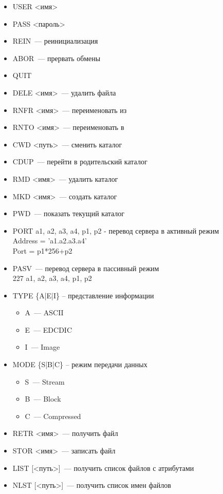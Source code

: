 \begin{itemize}
    \item USER <имя>
    \item PASS <пароль>
    \item REIN~--- реинициализация
    \item ABOR~--- прервать обмены
    \item QUIT
    \item DELE <имя>~--- удалить файла
    \item RNFR <имя>~--- переименовать из
    \item RNTO <имя>~--- переименовать в
    \item CWD <путь>~--- сменить каталог
    \item CDUP~--- перейти в родительский каталог
    \item RMD <имя>~--- удалить каталог
    \item MKD <имя>~--- создать каталог
    \item PWD~--- показать текущий каталог
    \item PORT a1, a2, a3, a4, p1, p2 - перевод сервера в активный режим\\
    Address = 'a1.a2.a3.a4'\\
    Port = p1*256+p2
    \item PASV~--- перевод сервера в пассивный режим\\
    227 a1, a2, a3, a4, p1, p2
    \item TYPE \{A|E|I\} – представление информации
    \begin{itemize}
        \item A~--- ASCII
        \item E~--- EDCDIC
        \item I~--- Image
    \end{itemize}
    \item MODE \{S|B|C\} – режим передачи данных
    \begin{itemize}
        \item S~--- Stream
        \item B~--- Block
        \item C~--- Compressed
    \end{itemize}
    \item RETR <имя>~--- получить файл
    \item STOR <имя>~--- записать файл
    \item LIST [<путь>]~--- получить список файлов с атрибутами
    \item NLST [<путь>]~--- получить список имен файлов
\end{itemize}


